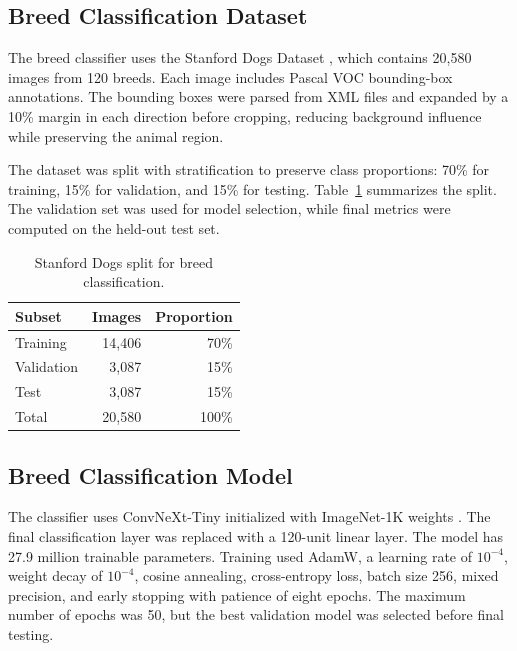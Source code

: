 \documentclass[conference]{IEEEtran}
\begin{document}
\subsection{Breed Classification Dataset}

The breed classifier uses the Stanford Dogs Dataset \cite{khosla2012stanforddogs}, which contains 20,580 images from 120 breeds. Each image includes Pascal VOC bounding-box annotations. The bounding boxes were parsed from XML files and expanded by a 10\% margin in each direction before cropping, reducing background influence while preserving the animal region.

The dataset was split with stratification to preserve class proportions: 70\% for training, 15\% for validation, and 15\% for testing. Table~\ref{tab:stanford_split} summarizes the split. The validation set was used for model selection, while final metrics were computed on the held-out test set.

\begin{table}[t]
\centering
\caption{Stanford Dogs split for breed classification.}
\label{tab:stanford_split}
\begin{tabular}{lrr}
\toprule
Subset & Images & Proportion \\
\midrule
Training & 14,406 & 70\% \\
Validation & 3,087 & 15\% \\
Test & 3,087 & 15\% \\
\midrule
Total & 20,580 & 100\% \\
\bottomrule
\end{tabular}
\end{table}

\subsection{Breed Classification Model}

The classifier uses ConvNeXt-Tiny initialized with ImageNet-1K weights \cite{deng2009imagenet,liu2022convnext}. The final classification layer was replaced with a 120-unit linear layer. The model has 27.9 million trainable parameters. Training used AdamW, a learning rate of $10^{-4}$, weight decay of $10^{-4}$, cosine annealing, cross-entropy loss, batch size 256, mixed precision, and early stopping with patience of eight epochs. The maximum number of epochs was 50, but the best validation model was selected before final testing.
\end{document}
